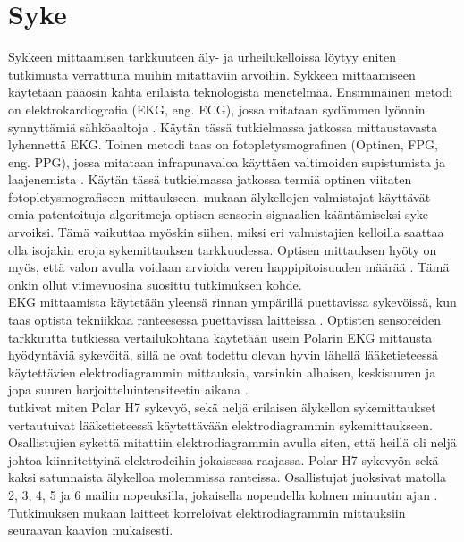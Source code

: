 \documentclass[utf8,bachelor,finnish]{bachelor}
\begin{document}
   \section{Syke}
  Sykkeen mittaamisen tarkkuuteen äly- ja urheilukelloissa löytyy eniten tutkimusta verrattuna muihin mitattaviin arvoihin.
   Sykkeen mittaamiseen käytetään pääosin kahta erilaista teknologista menetelmää. Ensimmäinen metodi on elektrokardiografia (EKG, eng. ECG), jossa mitataan sydämmen lyönnin
   synnyttämiä sähköaaltoja \parencite{noauthor_heart_nodate}. Käytän tässä tutkielmassa jatkossa mittaustavasta lyhennettä EKG.
    Toinen metodi taas on fotopletysmografinen (Optinen, FPG, eng. PPG), jossa mitataan infrapunavaloa käyttäen valtimoiden supistumista ja laajenemista \parencite{noauthor_heart_nodate}.
      Käytän tässä tutkielmassa jatkossa termiä optinen viitaten fotopletysmografiseen
      mittaukseen. \textcite{nelson_accuracy_2019} mukaan älykellojen valmistajat käyttävät omia patentoituja algoritmeja optisen sensorin
       signaalien kääntämiseksi syke arvoiksi. Tämä vaikuttaa myöskin siihen, miksi eri valmistajien kelloilla saattaa olla isojakin eroja
        sykemittauksen tarkkuudessa. Optisen mittauksen hyöty on myös, että  valon avulla voidaan arvioida veren happipitoisuuden määrää \parencite{noauthor_heart_nodate}.
         Tämä onkin ollut viimevuosina suosittu tutkimuksen kohde.\\
      
      EKG mittaamista käytetään yleensä rinnan ympärillä puettavissa sykevöissä, kun taas optista tekniikkaa ranteesessa puettavissa laitteissa \parencite{noauthor_heart_nodate}.
       Optisten sensoreiden tarkkuutta tutkiessa vertailukohtana käytetään usein Polarin EKG mittausta hyödyntäviä sykevöitä, sillä ne ovat todettu olevan hyvin lähellä
        lääketieteessä käytettävien elektrodiagrammin mittauksia, varsinkin alhaisen, keskisuuren ja jopa suuren harjoitteluintensiteetin aikana
         \parencite{gilgen-ammann_rr_2019, nelson_accuracy_2019}. \\


   \textcite{wang_accuracy_2017} tutkivat miten Polar H7 sykevyö, sekä neljä erilaisen älykellon sykemittaukset vertautuivat lääketieteessä käytettävään
    elektrodiagrammin sykemittaukseen. Osallistujien sykettä mitattiin elektrodiagrammin avulla siten,
      että heillä oli neljä johtoa kiinnitettyinä elektrodeihin jokaisessa raajassa. Polar H7 sykevyön sekä kaksi satunnaista älykelloa molemmissa ranteissa.
       Osallistujat juoksivat matolla 2, 3, 4, 5 ja 6 mailin nopeuksilla, jokaisella nopeudella kolmen minuutin ajan \parencite{wang_accuracy_2017}.
        Tutkimuksen mukaan laitteet korreloivat elektrodiagrammin mittauksiin seuraavan kaavion mukaisesti.\\
\end{document}
